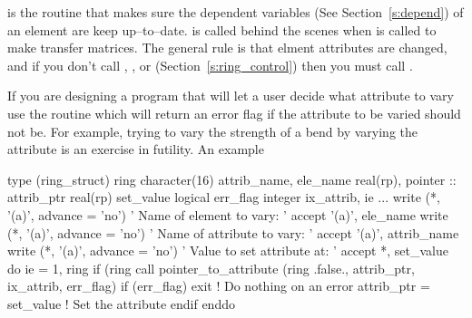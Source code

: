 {{{{{{{{{{{{ is the routine that makes sure the dependent
variables (See Section~\ref{s:depend}) of an element are keep
up--to--date.  is called behind the scenes
when  is called to make transfer matrices. The general
rule is that elment attributes are changed, and if you don't call
, , or 
(Section~\ref{s:ring_control}) then you must call
.

If you are designing a program that will let a user decide what
attribute to vary use the routine  which will
return an error flag if the attribute to be varied should not be. For
example, trying to vary the strength of a bend by varying the 
attribute is an exercise in futility. An example
\begin{example}
  type (ring_struct) ring
  character(16) attrib_name, ele_name
  real(rp), pointer :: attrib_ptr
  real(rp) set_value
  logical err_flag
  integer ix_attrib, ie
  ...
  write (*, '(a)', advance = 'no') ' Name of element to vary: '
  accept '(a)', ele_name
  write (*, '(a)', advance = 'no') ' Name of attribute to vary: '
  accept '(a)', attrib_name
  write (*, '(a)', advance = 'no') ' Value to set attribute at: '
  accept *, set_value
  do ie = 1, ring%
    if (ring%
      call pointer_to_attribute (ring%
                            .false., attrib_ptr, ix_attrib, err_flag)
      if (err_flag) exit      ! Do nothing on an error
      attrib_ptr = set_value  ! Set the attribute
    endif
  enddo
\end{example}

\vn{%
whether it is the strength or field that is the 
independent variable. See Section~\ref{s:depend} for more details.

\section{Transfer Maps}

The first order transfer map through a element is stored in \vn{vec0}
and \vn{mat6}. Thus with \vn{Linear} tracking the appropriate formula is
\begin{example}
  orbit_out = %
\end{example}
The \bmad\ routines that compute \vn{%
take a reference orbit as an argument and the resulting \vn{%
is the Jacobian about the reference orbit.

}}}}}}}}}}}}}}}

